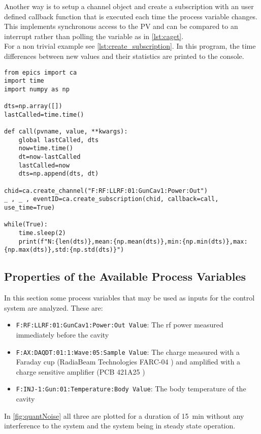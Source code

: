 Another way is to setup a channel object and create a subscription with an user defined callback function that is executed each time the process variable changes. This implements synchronous access to the PV and can be compared to an interrupt rather than polling the variable as in \autoref{lst:caget}.\\
For a non trivial example see \autoref{lst:create_subscription}. In this program, the time differences between new values and their statistics are printed to the console.

\begin{lstlisting}[style=python,caption = Using a user defined callback function to access an EPICS process value, label = lst:create_subscription]
from epics import ca
import time
import numpy as np

dts=np.array([])
lastCalled=time.time()

def call(pvname, value, **kwargs):
	global lastCalled, dts
	now=time.time()
	dt=now-lastCalled
	lastCalled=now
	dts=np.append(dts, dt)

chid=ca.create_channel("F:RF:LLRF:01:GunCav1:Power:Out")
_ , _ , eventID=ca.create_subscription(chid, callback=call, use_time=True)

while(True):
	time.sleep(2)
	print(f"N:{len(dts)},mean:{np.mean(dts)},min:{np.min(dts)},max:{np.max(dts)},std:{np.std(dts)}")
\end{lstlisting}




\subsection{Properties of the Available Process Variables}
In this section some process variables that may be used as inputs for the control system are analyzed. These are:
\begin{itemize}
\item \texttt{F:RF:LLRF:01:GunCav1:Power:Out Value}: The \gls{rf} power measured immediately before the cavity
\item \texttt{F:AX:DAQDT:01:1:Wave:05:Sample Value}: The charge measured with a Faraday cup (RadiaBeam Technologies FARC-04 \cite{radiabeamFaradayCups}) and amplified with a charge sensitive amplifier (PCB 421A25 \cite{pcbsynotechPCB421A25Charge})
\item \texttt{F:INJ-1:Gun:01:Temperature:Body Value}: The body temperature of the cavity
\end{itemize}

In \autoref{fig:quantNoise} all three are plotted for a duration of \SI{15}{\minute} without any interference to the system and the system being in steady state operation.

